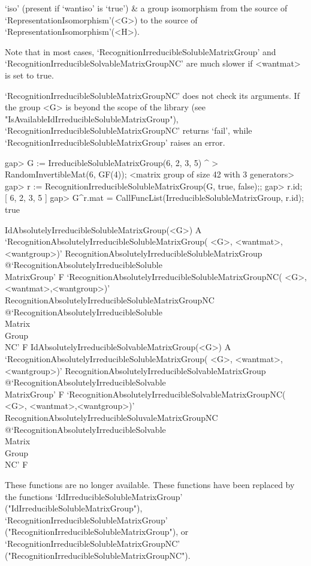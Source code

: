 `iso' (present if `wantiso' is `true') & a group isomorphism from the source of
    `RepresentationIsomorphism'(<G>) to the source of `RepresentationIsomorphism'(<H>).
    
\enditems
Note that in most cases, `Recog\-nition\-Irreducible\-Soluble\-Matrix\-Group' and 
`Recog\-nition\-Irreducible\-Sol\-vable\-Matrix\-Group\-NC' are 
much slower if <wantmat> is set to true.   

`RecognitionIrreducibleSolubleMatrixGroupNC' does not check its arguments. If
the group <G> is beyond the scope of the {\IRREDSOL} library (see "IsAvailableIdIrreducibleSolubleMatrixGroup"), 
`RecognitionIrreducibleSolubleMatrixGroupNC' returns `fail', while `RecognitionIrreducibleSolubleMatrixGroup' raises an error.

\beginexample
gap> G := IrreducibleSolubleMatrixGroup(6, 2, 3, 5) ^
>         RandomInvertibleMat(6, GF(4));
<matrix group of size 42 with 3 generators>
gap> r := RecognitionIrreducibleSolubleMatrixGroup(G, true, false);;
gap> r.id;
[ 6, 2, 3, 5 ]
gap> G^r.mat = CallFuncList(IrreducibleSolubleMatrixGroup, r.id);
true
\endexample


\>IdAbsolutelyIrreducibleSolubleMatrixGroup(<G>) A
\>`RecognitionAbsolutelyIrreducibleSolubleMatrixGroup(%
   <G>, <wantmat>, <wantgroup>)'%
{RecognitionAbsolutelyIrreducibleSolubleMatrixGroup}%
@{`RecognitionAbsolutelyIrreducibleSoluble\\MatrixGroup'} F
\>`RecognitionAbsolutelyIrreducibleSolubleMatrixGroupNC(%
   <G>, <wantmat>,<wantgroup>)'%
{RecognitionAbsolutelyIrreducibleSolubleMatrixGroupNC}%
@{`RecognitionAbsolutelyIrreducibleSoluble\\Matrix\\Group\\NC'} F
\>IdAbsolutelyIrreducibleSolvableMatrixGroup(<G>) A
\>`RecognitionAbsolutelyIrreducibleSolubleMatrixGroup(%
   <G>, <wantmat>, <wantgroup>)'%
{RecognitionAbsolutelyIrreducibleSolvableMatrixGroup}%
@{`RecognitionAbsolutelyIrreducibleSolvable\\MatrixGroup'} F
\>`RecognitionAbsolutelyIrreducibleSolvableMatrixGroupNC(%
   <G>, <wantmat>,<wantgroup>)'%
{RecognitionAbsolutelyIrreducibleSoluvaleMatrixGroupNC}%
@{`RecognitionAbsolutelyIrreducibleSolvable\\Matrix\\Group\\NC'} F

These functions are no longer available. These functions have been replaced by the
functions 
`IdIrreducibleSolubleMatrixGroup' ("IdIrreducibleSolubleMatrixGroup"), 
`RecognitionIrreducibleSolubleMatrixGroup' ("RecognitionIrreducibleSolubleMatrixGroup"), or
`Recognition\-Irre\-du\-ci\-bleSolubleMatrixGroupNC' ("RecognitionIrreducibleSolubleMatrixGroupNC").


